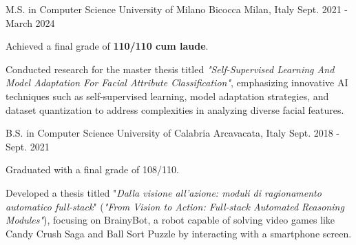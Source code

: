 

\begin{cventries}

\cventry
    {M.S. in Computer Science} %
    {University of Milano Bicocca} %
    {Milan, Italy} %
    {Sept. 2021 - March 2024} %
    {
      \begin{cvitems} %
        \item Achieved a final grade of \textbf{110/110 cum laude}.
        \item Conducted research for the master thesis titled \textit{"Self-Supervised Learning And Model Adaptation For Facial Attribute Classification"}, emphasizing innovative AI techniques such as self-supervised learning, model adaptation strategies, and dataset quantization to address complexities in analyzing diverse facial features.
      \end{cvitems}
    }
    
\cventry
    {B.S. in Computer Science} %
    {University of Calabria} %
    {Arcavacata, Italy} %
    {Sept. 2018 - Sept. 2021} %
    {
      \begin{cvitems} %
        \item Graduated with a final grade of 108/110.
        \item Developed a thesis titled "\textit{Dalla visione all’azione: moduli di ragionamento automatico full-stack}" (\textit{"From Vision to Action: Full-stack Automated Reasoning Modules"}), focusing on BrainyBot, a robot capable of solving video games like Candy Crush Saga and Ball Sort Puzzle by interacting with a smartphone screen.
      \end{cvitems}
    }
    

\end{cventries}
